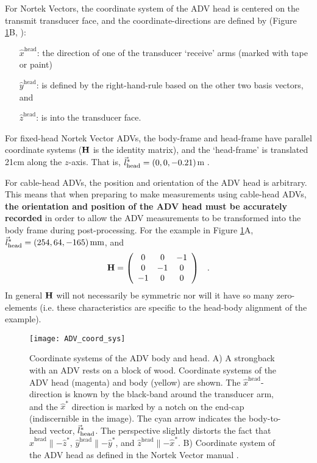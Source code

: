 For Nortek Vectors, the coordinate system of the ADV head is centered on the transmit transducer face, and the coordinate-directions are defined by (Figure \ref{fig:adv-coord-sys}B, \cite{vector_manual2005}):
\begin{itemize}
\item[$\hat{x}^\mathrm{head}$:] the direction of one of the transducer `receive' arms (marked with tape or paint)
\item[$\hat{y}^\mathrm{head}$:] is defined by the right-hand-rule based on the other two basis vectors, and
\item[$\hat{z}^\mathrm{head}$:] is into the transducer face.
\end{itemize}

For fixed-head Nortek Vector ADVs, the body-frame and head-frame have parallel coordinate systems ($\mathbf{H}$ is the identity matrix), and the `head-frame' is translated 21cm along the $z$-axis.  That is, $\vec{l}_\mathrm{head}^* = (0, 0, -0.21)$m \cite[]{vector_manual2005}.  

For cable-head ADVs, the position and orientation of the ADV head is arbitrary.  This means that when preparing to make measurements using cable-head ADVs, {\bf the orientation and position of the ADV head must be accurately recorded} in order to allow the ADV measurements to be transformed into the body frame during post-processing. For the example in Figure \ref{fig:adv-coord-sys}A, $\vec{l}_\mathrm{head}^* = (254,64,-165)\,\mathrm{mm}$, and
\begin{align*}
  \mathbf{H} &= \left (
    \begin{array}{ccc}
      0 & 0 & -1 \\
      0 & -1 & 0 \\
      -1 & 0 & 0
    \end{array}
    \right ) & .
\end{align*}
In general $\mathbf{H}$ will not necessarily be symmetric nor will it have so many zero-elements (i.e. these characteristics are specific to the head-body alignment of the example).


\begin{figure}
  \centering
  \texttt{[image: ADV\_coord\_sys]}
  \caption{Coordinate systems of the ADV body and head. A) A strongback with an ADV rests on a block of wood. Coordinate systems of the ADV head (magenta) and body (yellow) are shown. The $\hat{x}^\mathrm{head}$-direction is known by the black-band around the transducer arm, and the $\hat{x}^*$ direction is marked by a notch on the end-cap (indiscernible in the image). The cyan arrow indicates the body-to-head vector, $\vec{l}_\mathrm{head}^*$.  The perspective slightly distorts the fact that  $\hat{x}^\mathrm{head} \parallel -\hat{z}^* $, $\hat{y}^\mathrm{head} \parallel -\hat{y}^* $, and $\hat{z}^\mathrm{head} \parallel -\hat{x}^* $.  B) Coordinate system of the ADV head as defined in the Nortek Vector manual \cite[]{vector_manual2005}. }
  \label{fig:adv-coord-sys}
\end{figure}

